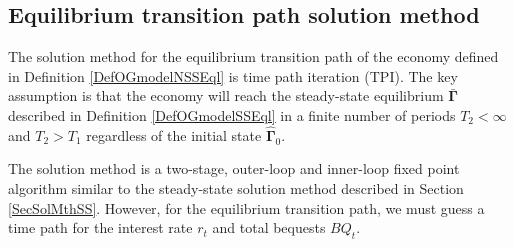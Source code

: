 \documentclass[letterpaper,12pt]{article}
\theoremstyle{definition}
\begin{document}
  \subsection{Equilibrium transition path solution method}\label{SecSolMthTP}

    The solution method for the equilibrium transition path of the economy defined in Definition \ref{DefOGmodelNSSEql} is time path iteration (TPI). The key assumption is that the economy will reach the steady-state equilibrium $\bm{\bar{\Gamma}}$ described in Definition \ref{DefOGmodelSSEql} in a finite number of periods $T_2<\infty$ and $T_2>T_1$ regardless of the initial state $\bm{\hat{\Gamma}}_0$.

    The solution method is a two-stage, outer-loop and inner-loop fixed point algorithm similar to the steady-state solution method described in Section \ref{SecSolMthSS}. However, for the equilibrium transition path, we must guess a time path for the interest rate $r_t$ and total bequests $BQ_t$.
\end{document}
